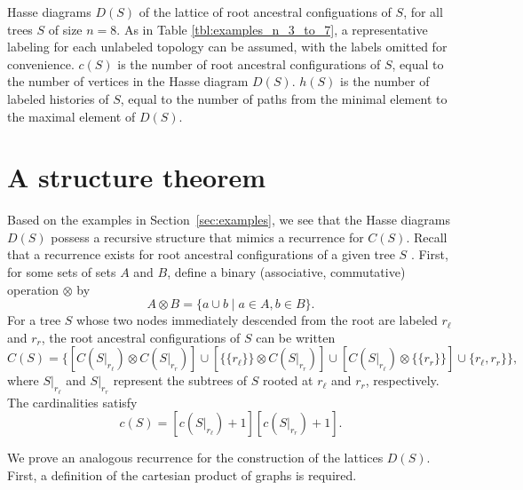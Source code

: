 \documentclass[10pt]{article}
\begin{document}
\begin{adjustwidth}{-30pt}{30pt}
\begin{table}
{\begin{minipage}{0.4\textwidth}
\end{minipage}}
\caption{Hasse diagrams $D(S)$ of the lattice of root ancestral configuations of $S$, for all trees $S$ of size $n=8$. As in Table \ref{tbl:examples_n_3_to_7}, a representative labeling for each unlabeled topology can be assumed, with the labels omitted for convenience. $c(S)$ is the number of root ancestral configurations of $S$, equal to the number of vertices in the Hasse diagram $D(S)$. $h(S)$ is the number of labeled histories of $S$, equal to the number of paths from the minimal element to the maximal element of $D(S)$.}
\label{tbl:examples_n_8}
\end{table}

\end{adjustwidth}

\clearpage
\section{A structure theorem}\label{sec:structure_description}

Based on the examples in Section~\ref{sec:examples}, we see that the Hasse diagrams $D(S)$ possess a recursive structure that mimics a recurrence for $C(S)$. Recall that a recurrence exists for root ancestral configurations of a given tree $S$ \citep[Proposition~1]{disanto2017enumeration}. First, for some sets of sets $A$ and $B$, define a binary (associative, commutative) operation $\otimes$ by
\[ A \otimes B = \{ a \cup b \mid a \in A, b\in B\}.\]
For a tree $S$ whose two nodes immediately descended from the root are labeled $r_\ell$ and $r_r$, the root ancestral configurations of $S$ can be written 
\begin{equation}
\label{eq:recur_enum}
	C(S) = \{ 
	\left[C(S|_{r_\ell}) \otimes C(S|_{r_r})\right] \cup 
	\left[\{\{r_\ell\}\} \otimes C(S|_{r_r})\right] \cup
    \left[C(S|_{r_\ell}) \otimes \{\{r_r\}\}\right] \cup 
	\{r_\ell,r_r\}\},
\end{equation}
where $S|_{r_\ell}$ and $S|_{r_r}$ represent the subtrees of $S$ rooted at $r_{\ell}$ and $r_r$, respectively. The cardinalities satisfy 
\begin{equation}
\label{eq:recur_count}
	c(S) = \left[c(S|_{r_\ell})+1\right] \left[c(S|_{r_r})+1\right].
\end{equation}

We prove an analogous recurrence for the construction of the lattices $D(S)$. First, a definition of the cartesian product of graphs \citep{sabidussi1959graph} is required.
\end{document}
